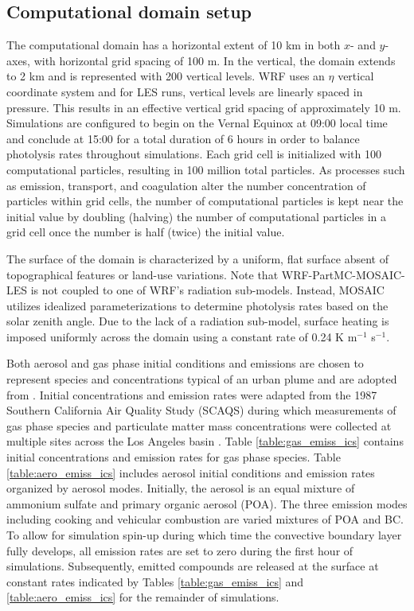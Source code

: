 \documentclass[journal abbreviation, manuscript]{copernicus}
\begin{document}
\subsection{Computational domain setup}

The computational domain has a horizontal extent of 10 km in both $x$- and $y$-axes, with horizontal grid spacing of 100 m. In the vertical, the domain extends to 2 km and is represented with 200 vertical levels. WRF uses an $\eta$ vertical coordinate system and for LES runs, vertical levels are linearly spaced in pressure. This results in an effective vertical grid spacing of approximately 10 m. Simulations are configured to begin on the Vernal Equinox at 09:00 local time and conclude at 15:00 for a total duration of 6 hours in order to balance photolysis rates throughout simulations. Each grid cell is initialized with 100 computational particles, resulting in 100 million total particles. As processes such as emission, transport, and coagulation alter the number concentration of particles within grid cells, the number of computational particles is kept near the initial value by doubling (halving) the number of computational particles in a grid cell once the number is half (twice) the initial  value. 

The surface of the domain is characterized by a uniform, flat surface absent of topographical features or land-use variations. Note that WRF-PartMC-MOSAIC-LES is not coupled to one of WRF's radiation sub-models. Instead,  
MOSAIC utilizes idealized parameterizations to determine photolysis rates based on the solar zenith angle. Due to the lack of a radiation sub-model, surface heating is imposed uniformly across the domain using a constant rate of 0.24 K m$^{-1}$ s$^{-1}$. 

Both aerosol and gas phase initial conditions and emissions are chosen to represent species and concentrations typical of an urban plume and are adopted from \citet{riemer_simulating_2009}. Initial concentrations and emission rates were adapted from the 1987 Southern California Air Quality Study (SCAQS) during which measurements of gas phase species and particulate matter mass concentrations were collected at multiple sites across the Los Angeles basin \citep{zaveri_model_2008}. Table \ref{table:gas_emiss_ics} contains initial concentrations and emission rates for gas phase species. Table \ref{table:aero_emiss_ics} includes aerosol initial conditions and emission rates organized by aerosol modes. Initially, the aerosol is an equal mixture of ammonium sulfate and primary organic aerosol (POA). The three emission modes including cooking and vehicular combustion are varied mixtures of POA and BC. To allow for simulation spin-up during which time the convective boundary layer fully develops, all emission rates are set to zero during the first hour of simulations. Subsequently, emitted compounds are released at the surface at constant rates indicated by Tables \ref{table:gas_emiss_ics} and \ref{table:aero_emiss_ics} for the remainder of simulations.
\end{document}
